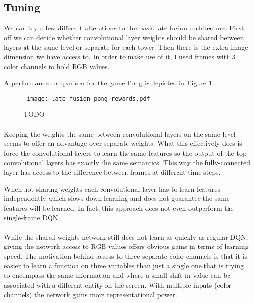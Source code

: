 \subsection{Tuning}
\label{sub:late_fusion_tuning}
We can try a few different alterations to the basic late fusion architecture.
First off we can decide whether convolutional layer weights should be shared
between layers at the same level
or separate for each tower.
Then there is the extra image dimension we have access to.
In order to make use of it,
I used frames with 3 color channels
to hold RGB values.

A performance comparison for the game Pong is depicted in
Figure \ref{fig:late_fusion_pong_rewards}.

\begin{figure}[htpb]
  \centering
  \texttt{[image: late\_fusion\_pong\_rewards.pdf]}
  \caption{TODO}
  \label{fig:late_fusion_pong_rewards}
\end{figure}

\paragraph{}
Keeping the weights the same between convolutional layers on the same level
seems to offer an advantage over separate weights.
What this effectively does
is force the convolutional layers to learn the same features
so the output of the top convolutional layers
has exactly the same semantics.
This way the fully-connected layer has access
to the difference between frames at different time steps.

When not sharing weights each convolutional layer
has to learn features independently which slows down learning
and does not guarantee the same features will be learned.
In fact, this approach does not even outperform
the single-frame DQN.

\paragraph{}
While  the shared weights network
still does not learn as quickly as regular DQN,
giving the network access to RGB values offers obvious gains
in terms of learning speed.
The motivation behind access to three separate color channels
is that it is easier to learn a function on three variables
than just a single one
that is trying to encompass the same information
and where a small shift in value can be associated
with a different entity on the screen.
With multiple inputs (color channels)
the network gains more representational power.

